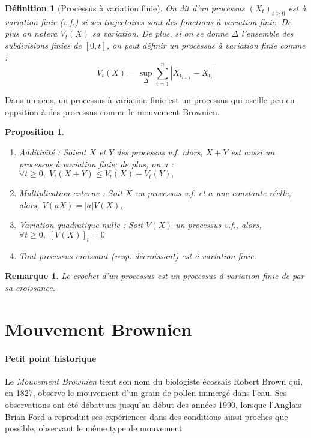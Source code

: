 \documentclass[openany]{book}
\newcommand{\1}{\mathbbm{1}}
\theoremstyle{thmfont}
\theoremstyle{deffont}
\newtheorem{definition}[definition]{Définition}
\theoremstyle{thmfont}
\newtheorem{prop}[prop]{Proposition}
\theoremstyle{deffont}
\newtheorem{remark}[remark]{Remarque}
\begin{document}
\begin{definition}[Processus à variation finie]
  On dit d'un processus $(X_t)_{t\geq0}$ est \textit{à variation finie} (v.f.) si ses trajectoires sont des fonctions à variation finie. De plus on notera $V_t(X)$ sa variation. De plus, si on se donne $\Delta$ l'ensemble des subdivisions finies de $[0,t]$, on peut définir un processus à variation finie comme :
%
  $$V_t(X) = \sup_{\Delta} \sum_{i=1}^n |X_{t_{i+1}} - X_{t_{i}}|$$
\end{definition}

Dans un sens, un processus à variation finie est un processus qui oscille peu en oppsition à des processus comme le mouvement Brownien. 

\begin{prop}
  \begin{enumerate}[nosep]
  \item Additivité : Soient $X$ et $Y$ des processus v.f. alors, $X+Y$ est aussi un processus à variation finie; de plus, on a : $\forall t \geq 0, \; V_t(X+Y) \leq V_t(X)+V_t(Y),$
  \item Multiplication externe : Soit $X$ un processus v.f. et $a$ une constante réelle, alors, $V(aX) = |a| V(X)$,
  \item Variation quadratique nulle : Soit $V(X)$ un processus v.f., alors, $\forall t \geq 0,\; [V(X)]_t=0$
  \item Tout processus croissant (resp. décroissant) est à variation finie.
  \end{enumerate}
\end{prop}

\begin{remark}
  Le crochet d'un processus est un processus à variation finie de par sa croissance.
\end{remark}

\section{Mouvement Brownien}
\paragraph{Petit point historique}
Le \textit{Mouvement Brownien} tient son nom du biologiste écossais Robert Brown qui, en 1827, observe le mouvement d'un grain de pollen immergé dans l'eau. Ses observations ont été débattues jusqu’au début des années 1990, lorsque l’Anglais Brian Ford a reproduit ses expériences dans des conditions aussi proches que possible, observant le même type de mouvement
\end{document}
